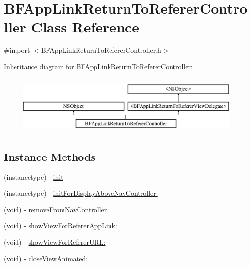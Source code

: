 \hypertarget{interface_b_f_app_link_return_to_referer_controller}{}\section{B\+F\+App\+Link\+Return\+To\+Referer\+Controller Class Reference}
\label{interface_b_f_app_link_return_to_referer_controller}


{\ttfamily \#import $<$B\+F\+App\+Link\+Return\+To\+Referer\+Controller.\+h$>$}

Inheritance diagram for B\+F\+App\+Link\+Return\+To\+Referer\+Controller\+:\begin{figure}[H]
\begin{center}
\leavevmode
\includegraphics[height=3.000000cm]{interface_b_f_app_link_return_to_referer_controller}
\end{center}
\end{figure}
\subsection*{Instance Methods}
\begin{DoxyCompactItemize}
\item 
(instancetype) -\/ \hyperlink{interface_b_f_app_link_return_to_referer_controller_aad7c9269c66d2eebf43f7f0902637aef}{init}
\item 
(instancetype) -\/ \hyperlink{interface_b_f_app_link_return_to_referer_controller_a8c47ee3e77c4a013e2e1ddcbaaeff433}{init\+For\+Display\+Above\+Nav\+Controller\+:}
\item 
(void) -\/ \hyperlink{interface_b_f_app_link_return_to_referer_controller_a58def555983b403482863d69e5787723}{remove\+From\+Nav\+Controller}
\item 
(void) -\/ \hyperlink{interface_b_f_app_link_return_to_referer_controller_aef5b073fe512d2ac391c475474c1eca8}{show\+View\+For\+Referer\+App\+Link\+:}
\item 
(void) -\/ \hyperlink{interface_b_f_app_link_return_to_referer_controller_a27c95883e5afd41342073d803794beb7}{show\+View\+For\+Referer\+U\+R\+L\+:}
\item 
(void) -\/ \hyperlink{interface_b_f_app_link_return_to_referer_controller_a13a65ce4cf4dcf07abafea5e14541d2e}{close\+View\+Animated\+:}
\end{DoxyCompactItemize}
